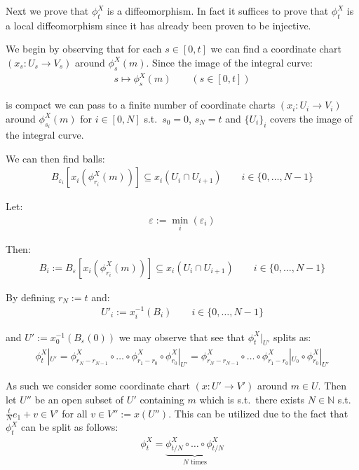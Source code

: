 		Next we prove that $\phi_t^X$ is a diffeomorphism. In fact it suffices to prove that $\phi_t^X$ is a local diffeomorphism since it has already been proven to be injective. \bigskip

		We begin by observing that for each $s \in [0, t]$ we can find a coordinate chart $(x_s : U_s \to V_s)$ around $\phi_s^X(m)$. Since the image of the integral curve:
		\begin{align*}
			s \mapsto \phi_s^X(m) \qquad (s \in [0, t])
		\end{align*}

		is compact we can pass to a finite number of coordinate charts $(x_i : U_i \to V_i)$ around $\phi_{s_i}^X(m)$ for $i \in [0, N]$ s.t.\ $s_0 = 0$, $s_N = t$ and $\{U_i\}_i$ covers the image of the integral curve. \bigskip

		We can then find balls:
		\begin{align*}
			B_{\varepsilon_i}[x_i(\phi_{r_i}^X(m))] \subseteq x_i(U_i \cap U_{i + 1}) \qquad i \in \{0, \ldots, N - 1\}
		\end{align*}

		Let:
		\begin{align*}
			\varepsilon := \min_i(\varepsilon_i)
		\end{align*}

		Then:
		\begin{align*}
			B_i := B_\varepsilon[x_i(\phi_{r_i}^X(m))] \subseteq x_i(U_i \cap U_{i + 1}) \qquad i \in \{0, \ldots, N - 1\}
		\end{align*}

		By defining $r_N := t$ and:
		\begin{align*}
			U'_i := x_i^{-1}(B_i) \qquad i \in \{0, \ldots, N - 1\}
		\end{align*}

		and $U' := x_0^{-1}(B_\varepsilon(0))$ we may observe that see that $\phi_t^X|_{U'}$ splits as:
		\begin{align*}
			\phi_t^X|_{U'} = \phi_{r_N - r_{N - 1}}^X \circ \ldots \circ \phi_{r_1 - r_0}^X \circ \phi_{r_0}^X|_{U'} = \phi_{r_N - r_{N - 1}}^X \circ \ldots \circ \phi_{r_1 - r_0}^X|_{U_0} \circ \phi_{r_0}^X|_{U'}
		\end{align*}

		As such we consider some coordinate chart $(x : U' \to V')$ around $m \in U$. Then let $U''$ be an open subset of $U'$ containing $m$ which is s.t.\ there exists $N \in \mathbb{N}$ s.t.\ $\frac{t}{N}e_1 + v \in V'$ for all $v \in V'' := x(U'')$. This can be utilized due to the fact that $\phi_t^X$ can be split as follows: 
		\begin{align*}
			\phi_t^X = \underbrace{\phi_{t/N}^X \circ \ldots \circ \phi_{t/N}^X}_{\text{$N$ times}}
		\end{align*}

